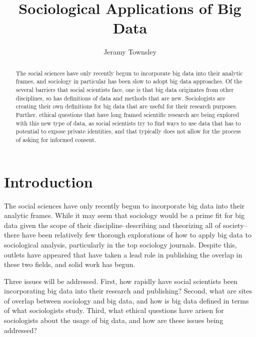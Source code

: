 \documentclass[sigconf]{acmart}
\begin{document}
\title{Sociological Applications of Big Data}


\author{Jeramy Townsley}




\begin{abstract}
The social sciences have only recently begun to incorporate big data into their analytic frames, and sociology in particular has been slow to adopt big data approaches.  Of the several barriers that social scientists face, one is that big data  originates from other disciplines, so has definitions of data and methods that are new.  Sociologists are creating their own definitions for big data that are useful for their research purposes.  Further, ethical questions that have long framed scientific research are being explored with this new type of data, as social scientists try to find ways to use data that has to potential to expose private identities, and that typically does not allow for the process of asking for informed consent.
\end{abstract}



\maketitle

\section{Introduction}


The social sciences have only recently begun to incorporate big data into their analytic frames.  While it may seem that sociology would be a prime fit for big data given the scope of their discipline--describing and theorizing all of society--there have been relatively few thorough explorations of how to apply big data to sociological analysis, particularly in the top sociology journals.  Despite this, outlets have appeared that have taken a lead role in publishing the overlap in these two fields, and solid work has begun. 

Three issues will be addressed.  First, how rapidly have social scientists been incorporating big data into their research and publishing?  Second, what are sites of overlap between sociology and big data, and how is big data defined in terms of what sociologists study.  Third, what ethical questions have arisen for sociologists about the usage of big data, and how are these issues being addressed?  
\end{document}
